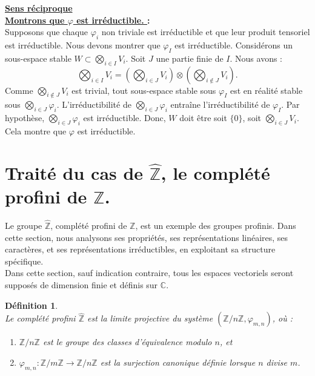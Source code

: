 \documentclass[a4paper, 14pt]{report}
\newtheorem{definition}{Définition}[section]
\begin{document}
\begin{onehalfspace}
{\begin{enumerate} [label=\roman*)]
				\textbf{\underline{	Sens réciproque}}\\
				\textbf{\underline{Montrons que \( \varphi \) est irréductible. } :}\\	
				Supposons que chaque \( \varphi_i \) non triviale est irréductible et que leur produit tensoriel est irréductible.  
				Nous devons montrer que \( \varphi_I \) est irréductible.
				Considérons un sous-espace stable \( W \subset \bigotimes_{i \in I} V_i \). Soit $J$ une partie finie de $I$.
				Nous avons :
				\[
				\bigotimes_{i \in I} V_i = \left( \bigotimes_{i \in J} V_i \right) \otimes \left( \bigotimes_{i \notin J} V_i \right).
				\]
				Comme \( \bigotimes_{i \notin J} V_i \) est trivial, tout sous-espace stable sous \( \varphi_I \) est en réalité stable sous \( \bigotimes_{i \in J} \varphi_i \).  
				L'irréductibilité de \( \bigotimes_{i \in J} \varphi_i \) entraîne l'irréductibilité de \( \varphi_I \). Par hypothèse, \( \bigotimes_{i \in J} \varphi_i \) est irréductible. Donc, \( W \) doit être soit \( \{0\} \), soit \( \bigotimes_{i \in J} V_i \).  
				Cela montre que \( \varphi \) est irréductible.
			\end{enumerate}
			
			
			
			\section{Traité du cas de $\widehat{\mathbb{Z}}$, le complété profini de $\mathbb{Z}$.}
Le groupe \( \widehat{\mathbb{Z}} \), complété profini de \( \mathbb{Z} \), est un exemple des groupes profinis. Dans cette section, nous analysons ses propriétés, ses représentations linéaires, ses caractères, et ses représentations irréductibles, en exploitant sa structure spécifique.\\
			
			Dans cette section, sauf indication contraire, tous les espaces vectoriels seront supposés de dimension finie et définis sur \( \mathbb{C} \).
			
			\begin{definition} \cite{ribes-zalesskii}\\
				Le complété profini $\widehat{\mathbb{Z}}$ est la limite projective du système $(\mathbb{Z}/n\mathbb{Z}, \varphi_{m,n})$, où :
				\begin{enumerate} [label=\roman*)]
					\item $\mathbb{Z}/n\mathbb{Z}$  est le groupe des classes d’équivalence modulo $n$, et
					\item $\varphi_{m,n} : \mathbb{Z}/m\mathbb{Z} \to \mathbb{Z}/n\mathbb{Z}$ est la surjection canonique définie lorsque $n$ divise $m$.
				\end{enumerate}
			\end{definition}
			
}
\end{onehalfspace}
\end{document}

